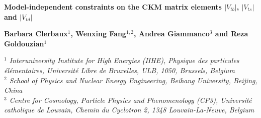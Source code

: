 \documentclass[11pt]{article}
\newcommand{\VTD}{|V_{td}|}
\newcommand{\VTS}{|V_{ts}|}
\newcommand{\VTB}{|V_{tb}|}
\newcommand{\fb}{$\rm fb^{-1}$}
\newcommand{\RN}[1]{%
  \textup{\uppercase\expandafter{\romannumeral#1}}%
}
\begin{document}
\begin{center}
\vspace*{10mm}

\vspace{1cm}
{\huge \bf  Model-independent constraints on the CKM matrix elements $\VTB$, $\VTS$ and $\VTD$   } \\
\vspace{1cm}

{ \bf Barbara Clerbaux$^1$,  Wenxing Fang$^{1,2}$, Andrea Giammanco$^3$ and Reza Goldouzian$^1$    }

 \vspace*{10mm}
   {\emph{$^1$ Interuniversity Institute for High Energies (IIHE),
Physique des particules \'el\'ementaires, Universit\'e Libre de Bruxelles, ULB, 1050, Brussels, Belgium} } \\
{\emph{$^2$ School of Physics and Nuclear Energy Engineering, Beihang University, Beijing, China} }\\
{\emph{$^3$ Centre for Cosmology, Particle Physics and Phenomenology (CP3), Universit\'e catholique de Louvain, Chemin du Cyclotron 2, 1348 Louvain-La-Neuve, Belgium} }
\vspace*{10mm}

\end{center}


\begin{abstract}
\noindent Single top quark production cross sections at hadron colliders are traditionally used to extract the modulus of the $V_{tb}$ element of the Cabibbo-Kobayashi-Maskawa matrix under the following assumption: $\VTB \gg \VTD, \VTS$.
We show that direct limits on $|V_{td}|$ and $|V_{ts}|$ can be extracted from differential measurements of single top quark cross sections in $t$-channel as a function of the rapidity of the light jet recoiling against the top quark, its angular distance from the reconstructed top quark, and the rapidity of the $b$ quark from top quark decay.
We perform a global fit of top quark related CKM elements to experimental data from the LHC Runs $\RN{1}$ and $\RN{2}$ and Tevatron. Experimental data include inclusive and differential single top cross sections in $t$-channel, inclusive tW production cross section, and top quark branching ratio to b quark and W boson. We present bounds on $|V_{tb}|$, $|V_{ts}|$ and $|V_{td}|$ using current data and project the results for future LHC data sets corresponding to luminosities of 300 and 3000 \fb.
\end{abstract}
\end{document}
